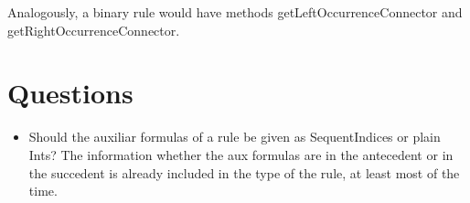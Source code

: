 \documentclass[11pt,a4paper]{article}
\begin{document}
Analogously, a binary rule would have methods getLeftOccurrenceConnector and getRightOccurrenceConnector.

\section{Questions}
\begin{itemize}
 \item Should the auxiliar formulas of a rule be given as SequentIndices or plain Ints? The information whether the aux formulas are in the antecedent or in the succedent is already included in the type of the rule, at least most of the time.
\end{itemize}
\end{document}
